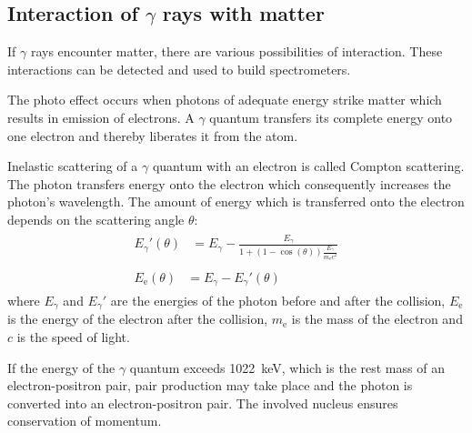 \subsection{Interaction of $\gamma$ rays with matter}
If $\gamma$ rays encounter matter, there are various possibilities of interaction. These interactions can be detected and used to build spectrometers.
%
\par
%
The photo effect occurs when photons of adequate energy strike matter which results in emission of electrons.
A $\gamma$ quantum transfers its complete energy onto one electron and thereby liberates it from the atom.
%
\par
%
Inelastic scattering of a $\gamma$ quantum with an electron is called Compton scattering.
The photon transfers energy onto the electron which consequently increases the photon's wavelength.
The amount of energy which is transferred onto the electron depends on the scattering angle $\theta$:
\begin{align}
    \label{eq:PhotonNachStoss}
    \begin{split}
        {E_{\gamma}}'(\theta) &= E_{\gamma} - \frac{E_{\gamma}}{1 + \left ( 1 - \cos(\theta) \right ) \frac{E_{\gamma}}{m_{\text{e}} c^2}}
    \end{split}
    \\
    \label{eq:ElektronNachStoss}
    \begin{split}
        E_{\text{e}}(\theta) &= E_{\gamma} - {E_{\gamma}}'(\theta)
    \end{split}
\end{align}
where $E_{\gamma}$ and ${E_{\gamma}}'$ are the energies of the photon before and after the collision, $E_{\text{e}}$ is the energy of the electron after the collision, $m_{\text{e}}$ is the mass of the electron and $c$ is the speed of light. \cite{AnleitungZusatz2}
%
\par
%
If the energy of the $\gamma$ quantum exceeds \SI{1022}{\kilo\electronvolt}, which is the rest mass of an electron-positron pair, pair production may take place and the photon is converted into an electron-positron pair.
The involved nucleus ensures conservation of momentum.
\cite{AnleitungZusatz1}
%
